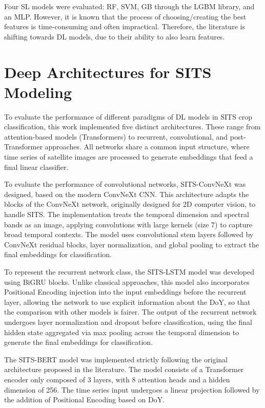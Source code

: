 Four SL models were evaluated: RF, SVM, GB through the LGBM library, and an MLP. However, it is known that the process of choosing/creating the best features is time-consuming and often impractical. Therefore, the literature is shifting towards DL models, due to their ability to also learn features.


\section{Deep Architectures for SITS Modeling}
\label{sec:models_supervised}

To evaluate the performance of different paradigms of DL models in SITS crop classification, this work implemented five distinct architectures. These range from attention-based models (Transformers) to recurrent, convolutional, and post-Transformer approaches. All networks share a common input structure, where time series of satellite images are processed to generate embeddings that feed a final linear classifier.

 To evaluate the performance of convolutional networks, SITS-ConvNeXt was designed, based on the modern ConvNeXt CNN. This architecture adapts the blocks of the ConvNeXt network, originally designed for 2D computer vision, to handle SITS. The implementation treats the temporal dimension and spectral bands as an image, applying convolutions with large kernels (size 7) to capture broad temporal contexts. The model uses convolutional stem layers followed by ConvNeXt residual blocks, layer normalization, and global pooling to extract the final embeddings for classification.

 To represent the recurrent network class, the SITS-LSTM model was developed using BiGRU blocks. Unlike classical approaches, this model also incorporates Positional Encoding injection into the input embeddings before the recurrent layer, allowing the network to use explicit information about the \ac{DoY}, so that the comparison with other models is fairer. The output of the recurrent network undergoes layer normalization and dropout before classification, using the final hidden state aggregated via max pooling across the temporal dimension to generate the final embeddings for classification.

 The SITS-BERT model was implemented strictly following the original architecture proposed in the literature. The model consists of a Transformer encoder only composed of 3 layers, with 8 attention heads and a hidden dimension of 256. The time series input undergoes a linear projection followed by the addition of Positional Encoding based on \ac{DoY}.


